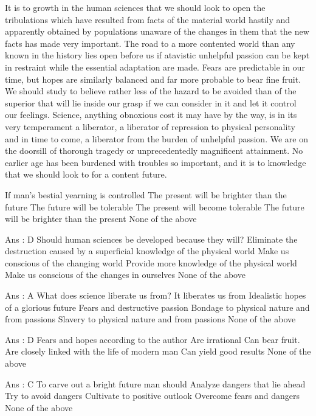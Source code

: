 It is to growth in the human sciences that we should look to open the tribulations which have resulted from facts of the material world hastily and apparently obtained by populations unaware of the changes in them that the new facts has made very important. The road to a more contented world than any known in the history lies open before us if atavistic unhelpful passion can be kept in restraint while the essential adaptation are made. Fears are predictable in our time, but hopes are similarly balanced and far more probable to bear fine fruit. We should study to believe rather less of the hazard to be avoided than of the superior that will lie inside our grasp if we can consider in it and let it control our feelings. Science, anything obnoxious cost it may have by the way, is in its very temperament a liberator, a liberator of repression to physical personality and in time to come, a liberator from the burden of unhelpful passion. We are on the doorsill of thorough tragedy or unprecedentedly magnificent attainment. No earlier age has been burdened with troubles so important, and it is to knowledge that we should look to for a content future.



    If man’s bestial yearning is controlled
        The present will be brighter than the future
        The future will be tolerable
        The present will become tolerable
        The future will be brighter than the present
        None of the above 

    Ans : D
    Should human sciences be developed because they will?
        Eliminate the destruction caused by a superficial knowledge of the physical world
        Make us conscious of the changing world
        Provide more knowledge of the physical world
        Make us conscious of the changes in ourselves
        None of the above 

    Ans : A
    What does science liberate us from? It liberates us from
        Idealistic hopes of a glorious future
        Fears and destructive passion
        Bondage to physical nature and from passions
        Slavery to physical nature and from passions
        None of the above 

    Ans : D
    Fears and hopes according to the author
        Are irrational
        Can bear fruit.
        Are closely linked with the life of modern man
        Can yield good results
        None of the above 

    Ans : C
    To carve out a bright future man should
        Analyze dangers that lie ahead
        Try to avoid dangers
        Cultivate to positive outlook
        Overcome fears and dangers
        None of the above 

